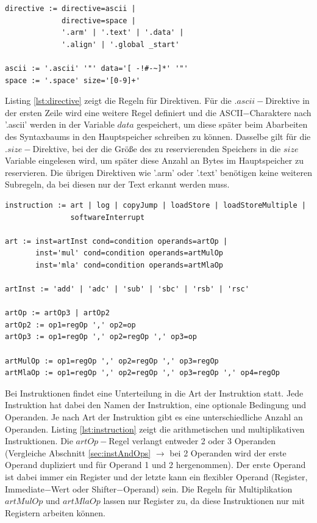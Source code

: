 \documentclass[a4paper, 11pt, onecolumn]{article}
\begin{document}
\begin{lstlisting}[basicstyle=\ttfamily\footnotesize, backgroundcolor=\color{backcolour}, caption={[Grammatik - Direktiven]Direktiven}, captionpos=b, label={lst:directive}]
directive := directive=ascii |
             directive=space |
             '.arm' | '.text' | '.data' |
             '.align' | '.global _start'

ascii := '.ascii' '"' data='[ -!#-~]*' '"'
space := '.space' size='[0-9]+'
\end{lstlisting}

Listing \ref{lst:directive} zeigt die Regeln für Direktiven. Für die $.ascii-$Direktive in der ersten Zeile wird eine weitere Regel definiert und die ASCII$-$Charaktere nach '.ascii' werden in der Variable $data$ gespeichert, um diese später beim Abarbeiten des Syntaxbaums in den Hauptspeicher schreiben zu können. Dasselbe gilt für die $.size-$Direktive, bei der die Größe des zu reservierenden Speichers in die $size$ Variable eingelesen wird, um später diese Anzahl an Bytes im Hauptspeicher zu reservieren. Die übrigen Direktiven wie '.arm' oder '.text' benötigen keine weiteren Subregeln, da bei diesen nur der Text erkannt werden muss.\\

\begin{lstlisting}[basicstyle=\ttfamily\footnotesize, backgroundcolor=\color{backcolour}, caption={[Grammatik $-$ Instruktionen]Instruktionen}, captionpos=b, label={lst:instruction}]
instruction := art | log | copyJump | loadStore | loadStoreMultiple |
               softwareInterrupt
               
art := inst=artInst cond=condition operands=artOp |
       inst='mul' cond=condition operands=artMulOp
       inst='mla' cond=condition operands=artMlaOp

artInst := 'add' | 'adc' | 'sub' | 'sbc' | 'rsb' | 'rsc'

artOp := artOp3 | artOp2
artOp2 := op1=regOp ',' op2=op
artOp3 := op1=regOp ',' op2=regOp ',' op3=op

artMulOp := op1=regOp ',' op2=regOp ',' op3=regOp
artMlaOp := op1=regOp ',' op2=regOp ',' op3=regOp ',' op4=regOp
\end{lstlisting}

Bei Instruktionen findet eine Unterteilung in die Art der Instruktion statt. Jede Instruktion hat dabei den Namen der Instruktion, eine optionale Bedingung und Operanden. Je nach Art der Instruktion gibt es eine unterschiedliche Anzahl an Operanden. Listing \ref{lst:instruction} zeigt die arithmetischen und multiplikativen Instruktionen. Die $artOp-$Regel verlangt entweder 2 oder 3 Operanden (Vergleiche Abschnitt \ref{sec:instAndOps} $\rightarrow$ bei 2 Operanden wird der erste Operand dupliziert und für Operand 1 und 2 hergenommen). Der erste Operand ist dabei immer ein Register und der letzte kann ein flexibler Operand (Register, Immediate$-$Wert oder Shifter$-$Operand) sein. Die Regeln für Multiplikation $artMulOp$ und $artMlaOp$ lassen nur Register zu, da diese Instruktionen nur mit Registern arbeiten können.
\end{document}
